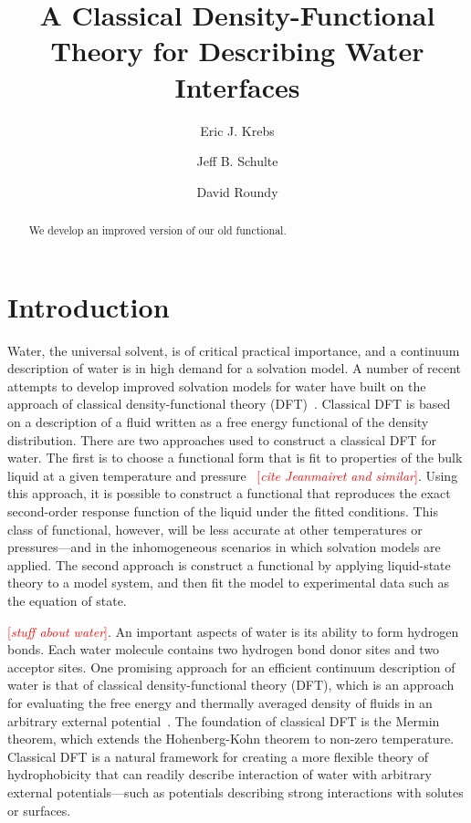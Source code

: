 \documentclass[twocolumn,amsmath,amssymb,prl]{revtex4-1}
\newcommand{\fixme}[1]{\textcolor{red}{[\emph{#1}]}}
\begin{document}
\title{A Classical Density-Functional Theory for Describing Water Interfaces}

\author{Eric J. Krebs}
\author{Jeff B. Schulte}
\author{David Roundy}

\begin{abstract}
We develop an improved version of our old functional.
\end{abstract}
\maketitle

\section{Introduction}

Water, the universal solvent, is of critical practical importance, and
a continuum description of water is in high demand for a solvation
model.  A number of recent attempts to develop improved solvation
models for water have built on the approach of classical
density-functional theory (DFT)~\cite{jeanmairet2013molecular,
  zhao2011molecular, zhao2011new, ramirez2005direct,
  ramirez2005density, levesque2012solvation, levesque2012scalar}.
Classical DFT is based on a description of a fluid written as a free
energy functional of the density distribution.  There are two
approaches used to construct a classical DFT for water.  The first is
to choose a functional form that is fit to properties of the bulk
liquid at a given temperature and pressure
\cite{jeanmairet2013molecular} ~\fixme{cite Jeanmairet and similar}.
Using this approach, it is possible to construct a functional that
reproduces the exact second-order response function of the liquid
under the fitted conditions.  This class of functional, however, will
be less accurate at other temperatures or pressures---and in the
inhomogeneous scenarios in which solvation models are applied.  The
second approach is construct a functional by applying liquid-state
theory to a model system, and then fit the model to experimental data
such as the equation of state.

\fixme{stuff about water}.  An important aspects of water
is its ability to form hydrogen bonds.  Each water molecule contains
two hydrogen bond donor sites and two acceptor sites.
%
One promising approach for an efficient continuum description of water
is that of classical density-functional theory (DFT), which is an
approach for evaluating the free energy and thermally averaged density
of fluids in an arbitrary external potential~\cite{ebner1976density}.
The foundation of classical DFT is the Mermin
theorem\cite{mermin1965thermal}, which extends the Hohenberg-Kohn
theorem\cite{hohenberg1964inhomogeneous} to non-zero temperature.
Classical DFT is a natural framework for creating a more flexible
theory of hydrophobicity that can readily describe interaction of
water with arbitrary external potentials---such as potentials
describing strong interactions with solutes or surfaces.
\end{document}

